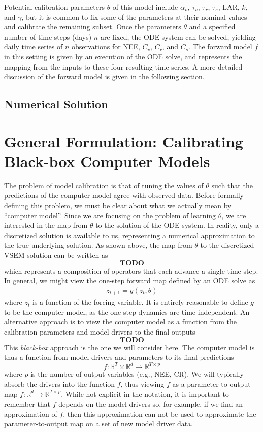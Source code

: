 \documentclass[12pt]{article}
\newcommand{\R}{\mathbb{R}}
\begin{document}
Potential calibration parameters $\theta$ of this model include $\alpha_v$, $\tau_v$, $\tau_r$, $\tau_s$, $\text{LAR}$, $k$, and $\gamma$, but it is common to fix some of the parameters at their 
nominal values and calibrate the remaining subset. 
Once the parameters $\theta$ and a specified number of time steps (days) $n$ are fixed, the ODE system can be solved, yielding daily time series of $n$
observations for NEE, $C_v$, $C_r$, and $C_s$. The forward model $f$ in this setting is given by an execution of the ODE solve, and represents
the mapping from the inputs to these four resulting time series. A more 
detailed discussion of the forward model is given in the following section. 

\subsection{Numerical Solution}

\section{General Formulation: Calibrating Black-box Computer Models}
The problem of model calibration is that of tuning the values of $\theta$ such that the predictions of the computer model agree with observed data. Before formally defining this problem, we must be clear about what we actually 
mean by ``computer model''. Since we are focusing on the problem of learning $\theta$, we are interested in the map from $\theta$ to the solution of the ODE system. In reality, only a discretized solution is available to us, representing 
a numerical approximation to the true underlying solution. As shown above, the map from $\theta$ to the discretized VSEM solution can be written as 
\[\textbf{TODO}\]
which represents a composition of operators that each advance a single time step. In general, we might view the one-step forward map defined by an ODE solve as 
\begin{align*}
z_{t + 1} = g(z_t, \theta)
\end{align*}
where $z_t$ is a function of the forcing variable. It is entirely reasonable to define $g$ to be the computer model, as the one-step dynamics are time-independent. An alternative approach is to view the computer model as a function from 
the calibration parameters and model drivers to the final outputs
\[\textbf{TODO}\]
This \textit{black-box} approach is the one we will consider here. The computer model is thus a function from model drivers and parameters to its final predictions
\[f: \R^T \times \R^d \to \R^{T \times p}\]
where $p$ is the number of output variables (e.g., NEE, CR). We will typically absorb the drivers into the function $f$, thus viewing $f$ as a parameter-to-output map $f: \R^d \to \R^{T \times p}$. While not explicit in the notation, it is important 
to remember that $f$ depends on the model drivers so, for example, if we find an approximation of $f$, then this approximation can not be used to approximate the parameter-to-output map on a set of new model driver data. 
\end{document}
